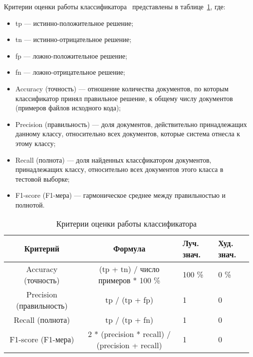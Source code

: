 Критерии оценки работы классификатора~\cite{metrics} представлены в таблице~\ref{tab:eval}, где:
\begin{itemize}
  \item tp --- истинно-положительное решение;
  \item tn --- истинно-отрицательное решение;
  \item fp --- ложно-положительное решение;
  \item fn --- ложно-отрицательное решение;
  \item Accuracy (точность) --- отношение количества документов, по которым классификатор принял правильное решение, к общему числу документов (примеров файлов исходного кода); 
  \item Precision (правильность) --- доля документов, действительно принадлежащих данному классу, относительно всех документов, которые система отнесла к этому классу;
  \item Recall (полнота) --- доля найденных классфикатором документов, принадлежащих классу, относительно всех документов этого класса в тестовой выборке;
  \item F1-score (F1-мера) --- гармоническое среднее между правильностью и полнотой.
\end{itemize}

\begin{table}[h!]
\caption{ Критерии оценки работы классификатора }
\label{tab:eval}
\begin{center}
\begin{tabularx}{\linewidth}{|c|c|X|X|}
\hline
Критерий & Формула & Луч. знач. & Худ. знач. \\
\hline
Accuracy (точность) & (tp + tn) / число примеров * 100 \% & 100 \% & 0 \% \\
\hline
Precision (правильность) & tp / (tp + fp) & 1 & 0 \\
\hline
Recall (полнота) & tp / (tp + fn) & 1 & 0 \\
\hline
F1-score (F1-мера) & 2 * (precision * recall) / (precision + recall) & 1 & 0 \\
\hline
\end{tabularx}
\end{center}
\end{table}
